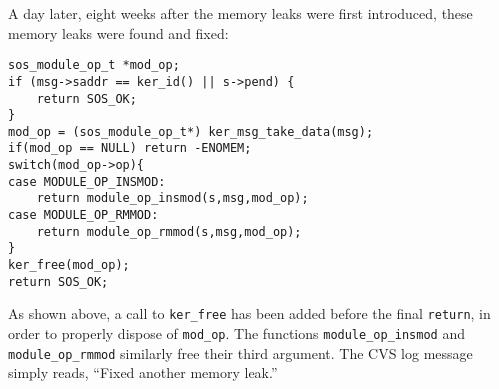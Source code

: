 A day later, eight weeks after the memory leaks were first introduced,
these memory leaks were found and fixed:

\begin{scriptsize}
\begin{verbatim}
sos_module_op_t *mod_op;
if (msg->saddr == ker_id() || s->pend) {
    return SOS_OK;
}
mod_op = (sos_module_op_t*) ker_msg_take_data(msg);
if(mod_op == NULL) return -ENOMEM;
switch(mod_op->op){
case MODULE_OP_INSMOD:
    return module_op_insmod(s,msg,mod_op);
case MODULE_OP_RMMOD:
    return module_op_rmmod(s,msg,mod_op);
}
ker_free(mod_op);
return SOS_OK;
\end{verbatim}
\end{scriptsize}

As shown above, a call to {\tt ker\_free} has been added before the
final {\tt return}, in order to properly dispose of {\tt mod\_op}.
The functions {\tt module\_op\_insmod} and {\tt module\_op\_rmmod}
similarly free their third argument.  The CVS log message simply
reads, ``Fixed another memory leak.''





